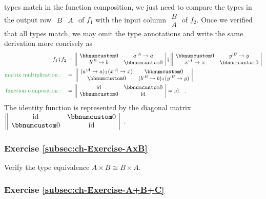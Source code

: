 types match in the function composition, we just need to compare the
types in the output row $\begin{array}{||cc|}
B & A\end{array}$ of $f_{1}$ with the input column $\begin{array}{|c||}
B\\
A
\end{array}$ of $f_{2}$. Once we verified that all types match, we may omit the
type annotations and write the same derivation more concisely as
\begin{align*}
f_{1}\bef f_{2} & =\,\begin{array}{||cc|}
\bbnum 0 & a^{:A}\rightarrow a\\
b^{:B}\rightarrow b & \bbnum 0
\end{array}\,\bef\,\begin{array}{||cc|}
\bbnum 0 & y^{:B}\rightarrow y\\
x^{:A}\rightarrow x & \bbnum 0
\end{array}\\
{\color{greenunder}\text{matrix multiplication}:}\quad & =\,\,\begin{array}{||cc|}
(a^{:A}\rightarrow a)\bef(x^{:A}\rightarrow x) & \bbnum 0\\
\bbnum 0 & (b^{:B}\rightarrow b)\bef(y^{:B}\rightarrow y)
\end{array}\\
{\color{greenunder}\text{function composition}:}\quad & =\,\begin{array}{||cc|}
\text{id} & \bbnum 0\\
\bbnum 0 & \text{id}
\end{array}\,=\text{id}\quad.
\end{align*}
The identity function is represented by the diagonal matrix $\,\begin{array}{||cc|}
\text{id} & \bbnum 0\\
\bbnum 0 & \text{id}
\end{array}$~.

\subsubsection{Exercise \label{subsec:ch-Exercise-AxB}\ref{subsec:ch-Exercise-AxB}}

Verify the type equivalence $A\times B\cong B\times A$.

\subsubsection{Exercise \label{subsec:ch-Exercise-A+B+C}\ref{subsec:ch-Exercise-A+B+C}}

